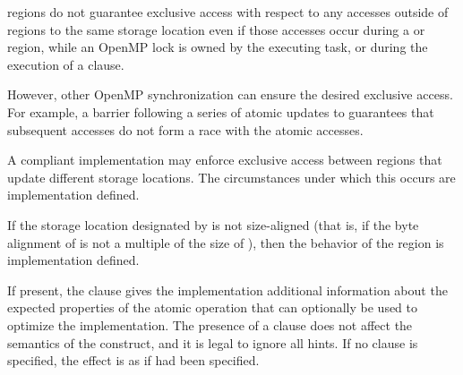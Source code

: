  regions do not guarantee exclusive access with respect to any accesses outside
of  regions to the same storage location  even if those accesses occur during a
 or  region, while an OpenMP lock is owned by the executing
task, or during the execution of a  clause.

However, other OpenMP synchronization can ensure the desired exclusive access. For
example, a barrier following a series of atomic updates to  guarantees that subsequent
accesses do not form a race with the atomic accesses.

A compliant implementation may enforce exclusive access between  regions
that update different storage locations. The circumstances under which this occurs are
implementation defined.

If the storage location designated by  is not size-aligned (that is, if the byte alignment
of  is not a multiple of the size of ), then the behavior of the  region is
implementation defined.

If present, the  clause gives the implementation additional
information about the expected properties of the atomic operation
that can optionally be used to optimize the implementation.
The presence of a  clause does not affect the semantics of
the  construct, and it is legal to ignore all hints.
If no  clause is specified, the effect is as if  had been specified.

